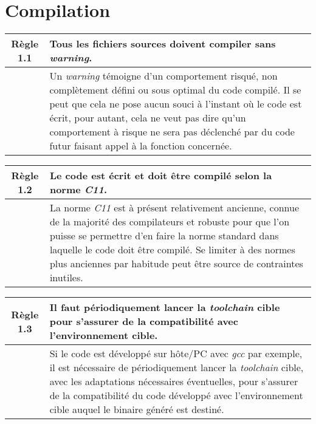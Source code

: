 \section{Compilation}

\begin{center}
\begin{tabular}{|c p{12.5cm}|}
\hline
\rowcolor{red!10}\textbf{Règle 1.1} & Tous les fichiers sources doivent compiler sans \textit{warning}. \\ \hline
 & Un \textit{warning} témoigne d'un comportement risqué, non complètement défini ou sous optimal du code compilé. Il se peut que cela ne pose aucun souci à l'instant où le code est écrit, pour autant, cela ne veut pas dire qu'un comportement à risque ne sera pas déclenché par du code futur faisant appel à la fonction concernée.\\ \hline
\hline
\end{tabular}
\end{center}

\medskip

\begin{center}
\begin{tabular}{|c p{12.5cm}|}
\hline
\rowcolor{red!10}\textbf{Règle 1.2} & Le code est écrit et doit être compilé selon la norme \textit{C11}. \\ \hline
 & La norme \textit{C11} est à présent relativement ancienne, connue de la majorité des compilateurs et robuste pour que l'on puisse se permettre d'en faire la norme standard dans laquelle le code doit être compilé. Se limiter à des normes plus anciennes par habitude peut être source de contraintes inutiles.\\ \hline
\hline
\end{tabular}
\end{center}

\medskip

\begin{center}
\begin{tabular}{|c p{12.5cm}|}
\hline
\rowcolor{red!10}\textbf{Règle 1.3} & Il faut périodiquement lancer la \textit{toolchain} cible pour s'assurer de la compatibilité avec l'environnement cible. \\ \hline
 &  Si le code est développé sur hôte/PC avec \textit{gcc} par exemple, il est nécessaire de périodiquement lancer la \textit{toolchain} cible, avec les adaptations nécessaires éventuelles, pour s'assurer de la compatibilité du code développé avec l'environnement cible auquel le binaire généré est destiné. \\ \hline
\hline
\end{tabular}
\end{center}

